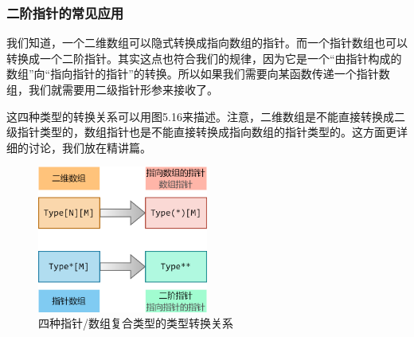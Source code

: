 \subsubsection*{二阶指针的常见应用}
我们知道，一个二维数组可以隐式转换成指向数组的指针。而一个指针数组也可以转换成一个二阶指针。其实这点也符合我们的规律，因为它是一个``由指针构成的数组''向``指向指针的指针''的转换。所以如果我们需要向某函数传递一个指针数组，我们就需要用二级指针形参来接收了。\par
这四种类型的转换关系可以用图5.16来描述。注意，二维数组是不能直接转换成二级指针类型的，数组指针也是不能直接转换成指向数组的指针类型的。这方面更详细的讨论，我们放在精讲篇。\par
\begin{figure}[htbp]
    \centering
    \includegraphics[width=0.5\textwidth]{../images/generalized_parts/05_type_conversions_between_array_and_pointer.png}
    \caption{四种指针/数组复合类型的类型转换关系}
\end{figure}\par
